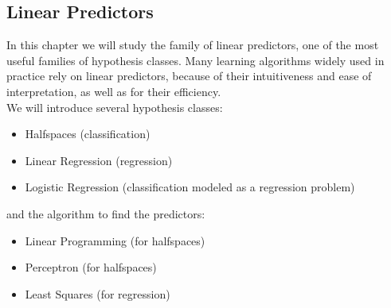 \documentclass[12pt]{report}
\theoremstyle{plain}
\begin{document}
\begin{flushleft}
\chapter{Linear Predictors}
In this chapter we will study the family of linear predictors, one of the most useful families of hypothesis classes. Many learning algorithms widely used in practice rely on linear predictors, because of their intuitiveness and ease of interpretation, as well as for their efficiency.\\
We will introduce several hypothesis classes:
\begin{itemize}
	\item Halfspaces (classification)
	\item Linear Regression (regression)
	\item Logistic Regression (classification modeled as a regression problem)
\end{itemize}
and the algorithm to find the predictors:
\begin{itemize}
	\item Linear Programming (for halfspaces)
	\item Perceptron (for halfspaces)
	\item Least Squares (for regression)
\end{itemize}
  

\end{flushleft}
\end{document}
